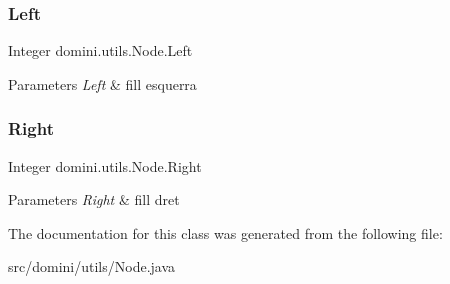 \subsubsection{\texorpdfstring{Left}{Left}}
{\footnotesize\ttfamily Integer domini.\+utils.\+Node.\+Left\hspace{0.3cm}{\ttfamily [package]}}


\begin{DoxyParams}{Parameters}
{\em Left} & fill esquerra \\
\hline
\end{DoxyParams}
\mbox{\label{classdomini_1_1utils_1_1Node_a73c97e595bad2513ee0a06ee4620236a}} 
\subsubsection{\texorpdfstring{Right}{Right}}
{\footnotesize\ttfamily Integer domini.\+utils.\+Node.\+Right\hspace{0.3cm}{\ttfamily [package]}}


\begin{DoxyParams}{Parameters}
{\em Right} & fill dret \\
\hline
\end{DoxyParams}


The documentation for this class was generated from the following file\+:\begin{DoxyCompactItemize}
\item 
src/domini/utils/Node.\+java\end{DoxyCompactItemize}
